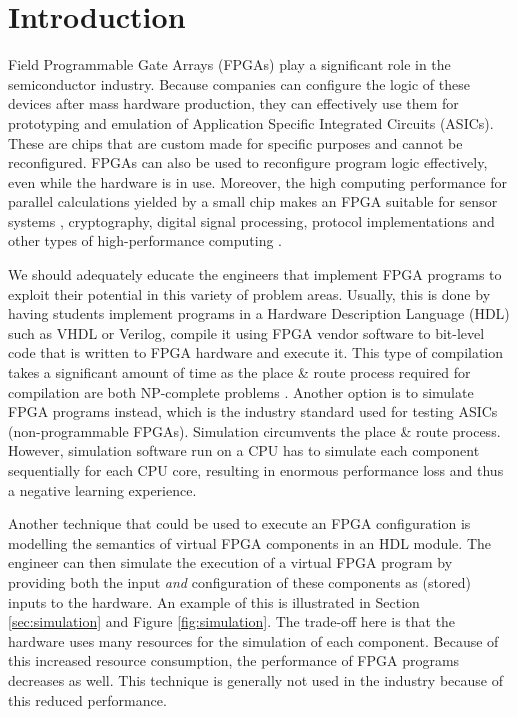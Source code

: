 \chapter{Introduction}
Field Programmable Gate Arrays (FPGAs) play a significant role in the semiconductor industry. Because companies can configure the logic of these devices after mass hardware production, they can effectively use them for prototyping and emulation of Application Specific Integrated Circuits (ASICs). These are chips that are custom made for specific purposes and cannot be reconfigured. FPGAs can also be used to reconfigure program logic effectively, even while the hardware is in use. Moreover, the high computing performance for parallel calculations yielded by a small chip makes an FPGA suitable for sensor systems \cite{Garcia20146247}, cryptography\cite{Yalla2009225, Nawari2015, Ikram2020172}, digital signal processing\cite{4566369}, protocol implementations\cite{Saha2014} and other types of high-performance computing \cite{Kanazawa2010}.

We should adequately educate the engineers that implement FPGA programs to exploit their potential in this variety of problem areas. Usually, this is done by having students implement programs in a Hardware Description Language (HDL) such as VHDL or Verilog, compile it using FPGA vendor software to bit-level code that is written to FPGA hardware and execute it. This type of compilation takes a significant amount of time as the place \& route process required for compilation are both NP-complete problems \cite{1585279}. Another option is to simulate FPGA programs instead, which is the industry standard used for testing ASICs (non-programmable FPGAs). Simulation circumvents the place \& route process. However, simulation software run on a CPU has to simulate each component sequentially for each CPU core, resulting in enormous performance loss and thus a negative learning experience.

Another technique that could be used to execute an FPGA configuration is modelling the semantics of virtual FPGA components in an HDL module. The engineer can then simulate the execution of a virtual FPGA program by providing both the input \textit{and} configuration of these components as (stored) inputs to the hardware. An example of this is illustrated in Section \ref{sec:simulation} and Figure \ref{fig:simulation}. The trade-off here is that the hardware uses many resources for the simulation of each component. Because of this increased resource consumption, the performance of FPGA programs decreases as well. This technique is generally not used in the industry because of this reduced performance.

